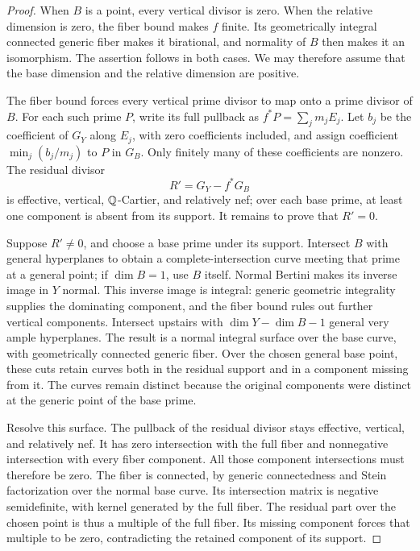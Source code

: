 \begin{proof}
When $B$ is a point, every vertical divisor is zero.
When the relative dimension is zero, the fiber bound
makes $f$ finite.  Its geometrically integral connected
generic fiber makes it birational, and normality of $B$
then makes it an isomorphism.  The assertion follows in
both cases.  We may therefore assume that the base
dimension and the relative dimension are positive.

The fiber bound forces every vertical prime divisor to
map onto a prime divisor of $B$.  For each such prime
$P$, write its full pullback as $f^*P=\sum_jm_jE_j$.
Let $b_j$ be the coefficient of $G_Y$ along $E_j$, with
zero coefficients included, and assign coefficient
$\min_j(b_j/m_j)$ to $P$ in $G_B$.  Only finitely many
of these coefficients are nonzero.  The residual divisor
\[
 R'=G_Y-f^*G_B
\]
is effective, vertical, $\mathbb{Q}$-Cartier, and relatively nef;
over each base prime, at least one component is absent
from its support.  It remains to prove that $R'=0$.

Suppose $R'\ne0$, and choose a base prime under its
support.  Intersect $B$ with general hyperplanes to
obtain a complete-intersection curve meeting that prime
at a general point; if $\dim B=1$, use $B$ itself.
Normal Bertini makes its inverse image in $Y$ normal.
This inverse image is integral: generic geometric
integrality supplies the dominating component, and
the fiber bound rules out further vertical components.
Intersect upstairs with $\dim Y-\dim B-1$ general
very ample hyperplanes.  The result is a normal integral
surface over the base curve, with geometrically connected
generic fiber.  Over the chosen general base point,
these cuts retain curves both in the residual support
and in a component missing from it.  The curves remain
distinct because the original components were distinct
at the generic point of the base prime.

Resolve this surface.  The pullback of the residual
divisor stays effective, vertical, and relatively nef.
It has zero intersection with the full fiber and
nonnegative intersection with every fiber component.
All those component intersections must therefore be
zero.  The fiber is connected, by generic connectedness
and Stein factorization over the normal base curve.
Its intersection matrix is negative semidefinite,
with kernel generated by the full fiber.  The residual
part over the chosen point is thus a multiple of the
full fiber.  Its missing component forces that multiple
to be zero, contradicting the retained component of
its support.
\end{proof}

